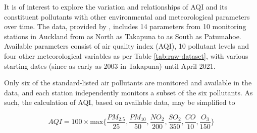 \documentclass{aucklandthesis}
\begin{document}
It is of interest to explore the variation and relationships of AQI and its constituent pollutants with other environmental and meteorological parameters over time. The data, provided by \textcite{aklenvdata}, includes 14 parameters from 10 monitoring stations in Auckland from as North as Takapuna to as South as Patumahoe. Available parameters consist of air quality index (AQI), 10 pollutant levels and four other meteorological variables as per Table \ref{tab:raw-dataset}, with various starting dates (since as early as 2003 in Takapuna) until April 2021.

Only six of the standard-listed air pollutants are monitored and available in the data, and each station independently monitors a subset of the six pollutants. As such, the calculation of AQI, based on available data, may be simplified to

\begin{equation}\label{eq:aqicon} AQI = 100 \times \textrm{max}\{\frac{PM_{2.5}}{25}, \frac{PM_{10}}{50}, \frac{NO_{2}}{200}, \frac{SO_{2}}{350}, \frac{CO}{10}, \frac{O_{3}}{150}\} \end{equation}
\end{document}
